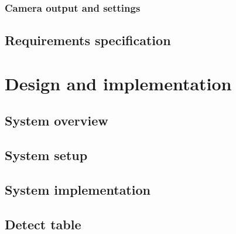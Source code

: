 %			
	
		\subsection{Camera output and settings}
			\label{sec:camera}
			
	
%			
	
					
	\section{Requirements specification}
		\label{sec:reqspec}
		

\chapter{Design and implementation}
	\label{solution}
	
	
	\section{System overview}
		\label{sec:sysdesign}
		

	\section{System setup}
		\label{sec:setup}
		
		
	\section{System implementation}
		\label{sec:implementation}
		
		
	\section{Detect table}
		\label{sec:table-locate}
			
		

